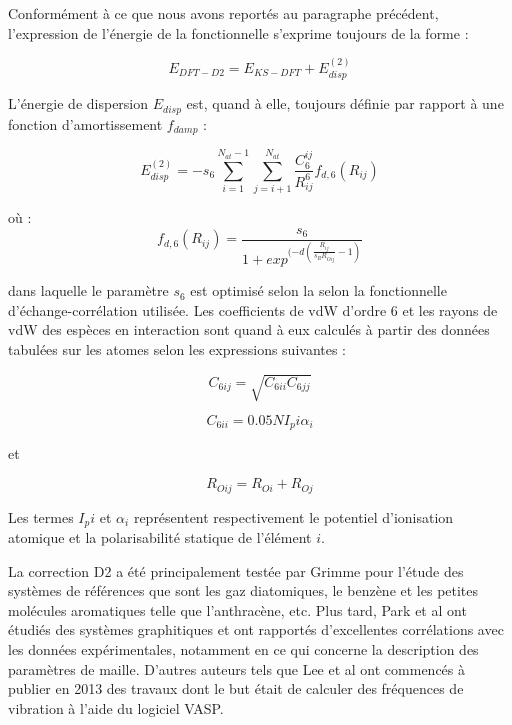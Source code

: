 	Conformément à ce que nous avons reportés au paragraphe précédent, l’expression de l'énergie de la fonctionnelle s’exprime toujours de la forme :
	
	\begin{equation}
	E_{DFT-D2} = E_{KS-DFT} + E_{disp}^{(2)}
	\end{equation}
	
	L'énergie de dispersion $E_{disp}$ est, quand à elle, toujours définie par rapport à une fonction d'amortissement $f_{damp}$ :
	
	\begin{equation}
	E_{disp}^{(2)}=-s_{6} \sum_{i=1}^{N_{at}-1} \sum_{j=i+1}^{N_{at}} \frac{C_{6}^{ij}}{R_{ij}^{6}} f_{d,6} (R_{ij})
	\end{equation}
	
	\noindent où :
	\begin{equation}
	f_{d,6} (R_{ij})= \frac{s_{6}}{1+exp^{(-d(\frac{R_{ij}}{s_{R}R_{Oij}}-1)}}  
	\end{equation}
		
		dans laquelle le paramètre $s_{6}$ est optimisé selon la selon la fonctionnelle d’échange-corrélation utilisée. Les coefficients de vdW d’ordre 6 et les rayons de vdW des espèces en interaction sont quand à eux calculés à partir des données tabulées sur les atomes selon les expressions suivantes :
		
		\begin{equation}
		C_{6ij} =\sqrt{C_{6ii}C_{6jj}}  
		\end{equation}

\begin{equation}
C_{6ii} = 0.05NI_{p}{i} \alpha_{i}
\end{equation}

et 

\begin{equation}
R_{Oij} = R_{Oi} + R_{Oj}
\end{equation}

Les termes $I_{p}{i}$ et $\alpha_{i}$ représentent respectivement le potentiel d’ionisation atomique et la polarisabilité statique de l’élément $i$.

La correction D2 a été principalement testée par Grimme \cite{grimme2006semiempirical} pour l’étude des systèmes de références que sont les gaz diatomiques, le benzène et les petites molécules aromatiques telle que l’anthracène, etc. Plus tard, Park et al \cite{park2011ab} ont étudiés des systèmes graphitiques et ont rapportés d’excellentes corrélations avec les données expérimentales, notamment en ce qui concerne la description des paramètres de maille. D’autres auteurs tels que Lee et al \cite{lee2013sum} ont commencés à publier en 2013 des travaux dont le but était de calculer des fréquences de vibration à l’aide du logiciel VASP.

